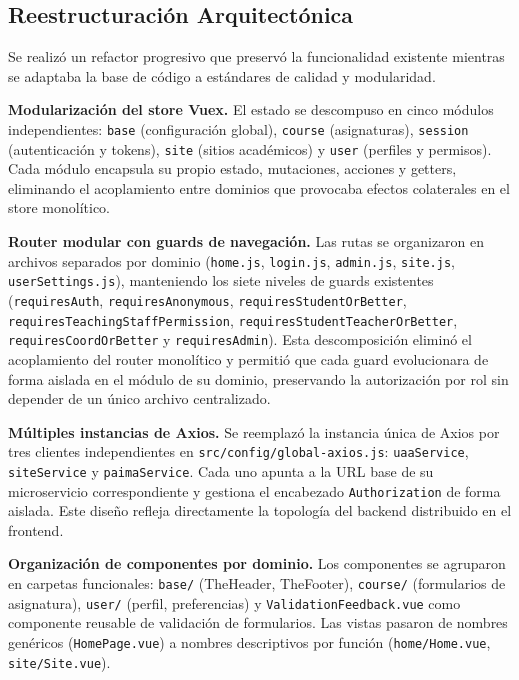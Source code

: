 \subsection{Reestructuración Arquitectónica}

Se realizó un refactor progresivo que preservó la funcionalidad existente
mientras se adaptaba la base de código a estándares de calidad y modularidad.

\textbf{Modularización del store Vuex.} El estado se descompuso en cinco módulos
independientes: \texttt{base} (configuración global), \texttt{course} (asignaturas),
\texttt{session} (autenticación y tokens), \texttt{site} (sitios académicos) y
\texttt{user} (perfiles y permisos). Cada módulo encapsula su propio estado,
mutaciones, acciones y getters, eliminando el acoplamiento entre dominios que
provocaba efectos colaterales en el store monolítico.

\textbf{Router modular con guards de navegación.} Las rutas se organizaron en
archivos separados por dominio (\texttt{home.js}, \texttt{login.js}, \texttt{admin.js},
\texttt{site.js}, \texttt{userSettings.js}), manteniendo los siete niveles de guards
existentes (\texttt{requiresAuth}, \texttt{requiresAnonymous},
\texttt{requiresStudentOrBetter}, \texttt{requiresTeachingStaffPermission},
\texttt{requiresStudentTeacherOrBetter}, \texttt{requiresCoordOrBetter} y
\texttt{requiresAdmin}). Esta descomposición eliminó el acoplamiento del router
monolítico y permitió que cada guard evolucionara de forma aislada en el
módulo de su dominio, preservando la autorización por rol sin depender de un
único archivo centralizado.

\textbf{Múltiples instancias de Axios.} Se reemplazó la instancia única de Axios
por tres clientes independientes en \texttt{src/config/global-axios.js}:
\texttt{uaaService}, \texttt{siteService} y \texttt{paimaService}. Cada uno apunta a la
URL base de su microservicio correspondiente y gestiona el encabezado
\texttt{Authorization} de forma aislada. Este diseño refleja directamente la
topología del backend distribuido en el frontend.

\textbf{Organización de componentes por dominio.} Los componentes se agruparon en
carpetas funcionales: \texttt{base/} (TheHeader, TheFooter), \texttt{course/}
(formularios de asignatura), \texttt{user/} (perfil, preferencias) y
\texttt{ValidationFeedback.vue} como componente reusable de validación de
formularios. Las vistas pasaron de nombres genéricos (\texttt{HomePage.vue}) a
nombres descriptivos por función (\texttt{home/Home.vue}, \texttt{site/Site.vue}).


